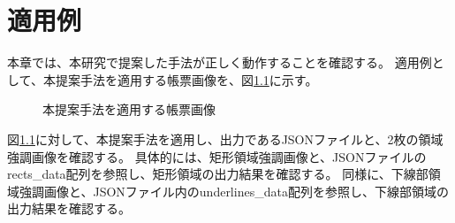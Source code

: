 \chapter{適用例}\label{cha:Indication}
本章では、本研究で提案した手法が正しく動作することを確認する。
適用例として、本提案手法を適用する帳票画像を、図\ref{fig:indication_original}に示す。

\begin{figure}[t]
    \begin{center}
        \caption{本提案手法を適用する帳票画像}
        \label{fig:indication_original}
    \end{center}
\end{figure}

図\ref{fig:indication_original}に対して、本提案手法を適用し、出力であるJSONファイルと、2枚の領域強調画像を確認する。
具体的には、矩形領域強調画像と、JSONファイルのrects\_data配列を参照し、矩形領域の出力結果を確認する。
同様に、下線部領域強調画像と、JSONファイル内のunderlines\_data配列を参照し、下線部領域の出力結果を確認する。

